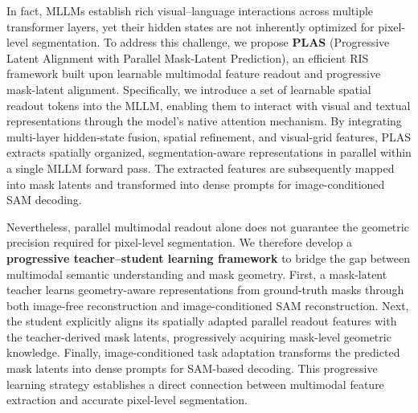 In fact, MLLMs establish rich visual--language interactions
across multiple transformer layers, yet their hidden
states are not inherently optimized for pixel-level
segmentation. To address this challenge, we propose
\textbf{PLAS} (Progressive Latent Alignment with
Parallel Mask-Latent Prediction), an efficient
RIS framework built upon learnable multimodal
feature readout and progressive mask-latent
alignment. Specifically, we introduce a set of
learnable spatial readout tokens into the MLLM,
enabling them to interact with visual and textual
representations through the model's native
attention mechanism. By integrating multi-layer
hidden-state fusion, spatial refinement, and
visual-grid features, PLAS extracts spatially
organized, segmentation-aware representations
in parallel within a single MLLM forward pass.
The extracted features are subsequently mapped
into mask latents and transformed into dense
prompts for image-conditioned SAM decoding.

Nevertheless, parallel multimodal readout alone
does not guarantee the geometric precision
required for pixel-level segmentation.
We therefore develop a
\textbf{progressive teacher--student learning
	framework} to bridge the gap between multimodal
semantic understanding and mask geometry.
First, a mask-latent teacher learns
geometry-aware representations from ground-truth
masks through both image-free reconstruction
and image-conditioned SAM reconstruction.
Next, the student explicitly aligns its
spatially adapted parallel readout features
with the teacher-derived mask latents,
progressively acquiring mask-level geometric
knowledge.
Finally, image-conditioned task adaptation
transforms the predicted mask latents into
dense prompts for SAM-based decoding.
This progressive learning strategy establishes
a direct connection between multimodal feature
extraction and accurate pixel-level segmentation.

